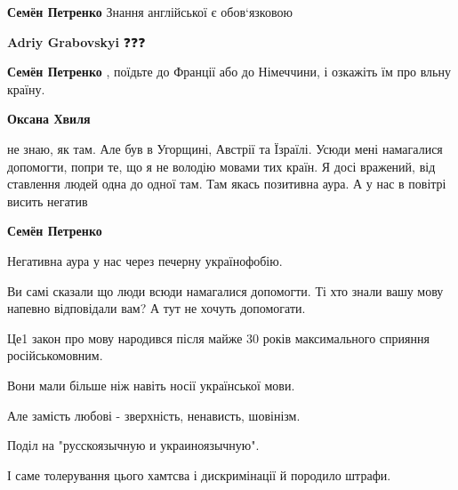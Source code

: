 \begin{itemize}
\begin{itemize}
\textbf{Семён Петренко} Знання англійської є обов‘язковою

 
\textbf{Adriy Grabovskyi} ❓❓❓

 
\textbf{Семён Петренко} , поїдьте до Франції або до Німеччини, і озкажіть їм про вльну країну.

 
\textbf{Оксана Хвиля} 

не знаю, як там. Але був в Угорщині, Австрії та Їзраїлі. Усюди мені намагалися
допомогти, попри те, що я не володію мовами тих країн. Я досі вражений, від
ставлення людей одна до одної там. Там якась позитивна аура. А у нас в повітрі
висить негатив

 
\textbf{Семён Петренко}

Негативна аура у нас через печерну українофобію.

Ви самі сказали що люди всюди намагалися допомогти. Ті хто знали вашу мову
напевно відповідали вам? А тут не хочуть допомогати.

Це1 закон про мову народився після майже 30 років максимального сприяння
російськомовним.

Вони мали більше ніж навіть носії української мови.

Але замість любові - зверхність, ненависть, шовінізм.

Поділ на "русскоязычную и украиноязычную".

І саме толерування цього хамтсва і дискримінації й породило штрафи.


\end{itemize}
\end{itemize}

